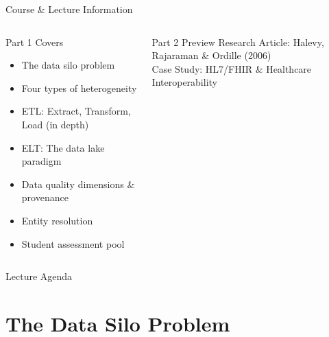 \documentclass[aspectratio=169,10pt]{beamer}
\begin{document}
\begin{frame}{Course \& Lecture Information}
\begin{columns}[T]
      \begin{exampleblock}{Part 1 Covers}
        \begin{itemize}
          \item The data silo problem
          \item Four types of heterogeneity
          \item ETL: Extract, Transform, Load (in depth)
          \item ELT: The data lake paradigm
          \item Data quality dimensions \& provenance
          \item Entity resolution
          \item Student assessment pool
        \end{itemize}
      \end{exampleblock}
      \vspace{4pt}
      \begin{block}{Part 2 Preview}
        Research Article: Halevy, Rajaraman \& Ordille (2006)\\
        Case Study: HL7/FHIR \& Healthcare Interoperability
      \end{block}
  \end{columns}
\end{frame}

\begin{frame}{Lecture Agenda}
  \tableofcontents
\end{frame}

\section{The Data Silo Problem}
\end{document}
